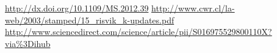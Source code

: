 \documentclass[a4paper, 11pt]{article} %
\begin{document}
	\begin{thebibliography}{9}
	
		\url{http://dx.doi.org/10.1109/MS.2012.39}
		 \url{http://www.cwr.cl/la-web/2003/stamped/15_risvik_k-updates.pdf}
		 \url{http://www.sciencedirect.com/science/article/pii/S016975529800110X?via\%3Dihub}

	\end{thebibliography}
\end{document}
